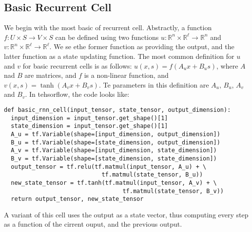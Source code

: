 \documentclass[10pt]{amsart}
\newcommand{\R}{\mathbb{R}}
\theoremstyle{definition}
\begin{document}
\subsection{Basic Recurrent Cell} We begin with the most basic of recurrent cell. Abstractly, a function $f:U\times S\to V\times S$ can be defined using two functions $u:\R^n\times \R^\ell\to \R^n$ and $v:\R^n\times\R^\ell \to \R^\ell$. We se ethe former function as providing the output, and the latter function as a state updating function.  The most common definition for $u$ and $v$ for basic recurrent cells is as follows: $u(x, s) = f(A_ux+B_us)$, where $A$ nad $B$ are matrices, and $f$ is a non-linear function, and $v(x, s) = \tanh(A_vx+B_vs)$. Te parameters in this definition are $A_u$, $B_u$, $A_v$ and $B_v$. In tehsorflow, the code looks like:

\begin{verbatim}
def basic_rnn_cell(input_tensor, state_tensor, output_dimension):
  input_dimension = input_tensor.get_shape()[1]
  state_dimension = input_tensor.get_shape()[1]
  A_u = tf.Variable(shape=[input_dimension, output_dimension])
  B_u = tf.Variable(shape=[state_dimension, output_dimension])
  A_v = tf.Variable(shape=[input_dimension, state_dimension])
  B_v = tf.Variable(shape=[state_dimension, state_dimension])
  output_tensor = tf.relu(tf.matmul(input_tensor, A_u) + \
                            tf.matmul(state_tensor, B_u))
  new_state_tensor = tf.tanh(tf.matmul(input_tensor, A_v) + \
                                  tf.matmul(state_tensor, B_v))
  return output_tensor, new_state_tensor
\end{verbatim}

A variant of this cell uses the output as a state vector, thus computing every step as a function of the cirrent ouput, and the previous output.
\end{document}
